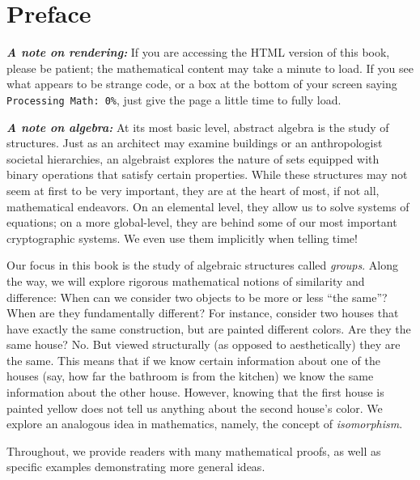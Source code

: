 \documentclass[10pt,]{book}
\newcommand{\alert}[1]{\textbf{\textit{#1}}}
\theoremstyle{plain}
\theoremstyle{definition}
\theoremstyle{definition}
\theoremstyle{definition}
\theoremstyle{definition}
\numberwithin{equation}{section}
\begin{document}
\chapter*{Preface}\label{preface-1}
\alert{A note on rendering:} If you are accessing the HTML version of this book, please be patient; the mathematical content may take a minute to load. If you see what appears to be strange code, or a box at the bottom of your screen saying \lstinline?Processing Math: 0%?, just give the page a little time to fully load.%
\par
\alert{A note on algebra:} At its most basic level, abstract algebra is the study of structures. Just as an architect may examine buildings or an anthropologist societal hierarchies, an algebraist explores the nature of sets equipped with binary operations that satisfy certain properties. While these structures may not seem at first to be very important, they are at the heart of most, if not all, mathematical endeavors. On an elemental level, they allow us to solve systems of equations; on a more global-level, they are behind some of our most important cryptographic systems. We even use them implicitly when telling time!%
\par
Our focus in this book is the study of algebraic structures called \emph{groups}.  Along the way, we will explore rigorous mathematical notions of similarity and difference: When can we consider two objects to be more or less ``the same''? When are they fundamentally different? For instance, consider two houses that have exactly the same construction, but are painted different colors. Are they the same house? No. But viewed structurally (as opposed to aesthetically) they are the same. This means that if we know certain information about one of the houses (say, how far the bathroom is from the kitchen) we know the same information about the other house. However, knowing that the first house is painted yellow does not tell us anything about the second house's color. We explore an analogous idea in mathematics, namely, the concept of \emph{isomorphism}.%
\par
Throughout, we provide readers with many mathematical proofs, as well as specific examples demonstrating more general ideas.%
\setcounter{tocdepth}{1}
\renewcommand*\contentsname{Contents}
\tableofcontents
\mainmatter
\typeout{************************************************}
\typeout{************************************************}
\end{document}
